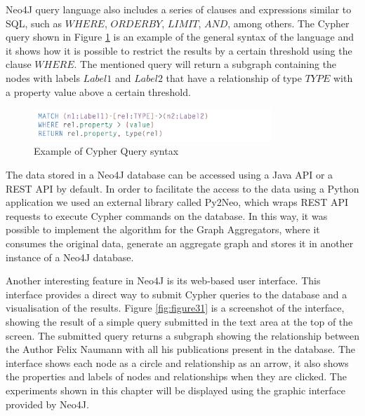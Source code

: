 Neo4J query language also includes a series of clauses and expressions similar to SQL, such as  $WHERE$, $ORDER BY$, $LIMIT$, $AND$, among others. The Cypher query shown in Figure \ref{fig:figure30} is an example of the general syntax of the language and it shows how it is possible to restrict the results by a certain threshold using the clause $WHERE$. The mentioned query will return a subgraph containing the nodes with labels $Label1$ and $Label2$ that have a relationship of type $TYPE$ with a property value above a certain threshold.

\begin{figure}[ht]
\centering
\includegraphics[width=0.8\textwidth]{../cypher_general_syntax.png}
\caption{Example of Cypher Query syntax \cite{Neo4jCypher}}
\label{fig:figure30}
\end{figure}

The data stored in a Neo4J database can be accessed using a Java API or a REST API by default. In order to facilitate the access to the data using a Python application we used an external library called Py2Neo, which wraps REST API requests to execute Cypher commands on the database. In this way, it was possible to implement the algorithm for the Graph Aggregators, where it consumes the original data, generate an aggregate graph and stores it in another instance of a Neo4J database.

Another interesting feature in Neo4J is its web-based user interface. This interface provides a direct way to submit Cypher queries to the database and a visualisation of the results. Figure \ref{fig:figure31} is a screenshot of the interface, showing the result of a simple query submitted in the text area at the top of the screen. The submitted query returns a subgraph showing the relationship between the Author Felix Naumann with all his publications present in the database. The interface shows each node as a circle and relationship as an arrow, it also shows the properties and labels of nodes and relationships when they are clicked. The experiments shown in this chapter will be displayed using the graphic interface provided by Neo4J.

